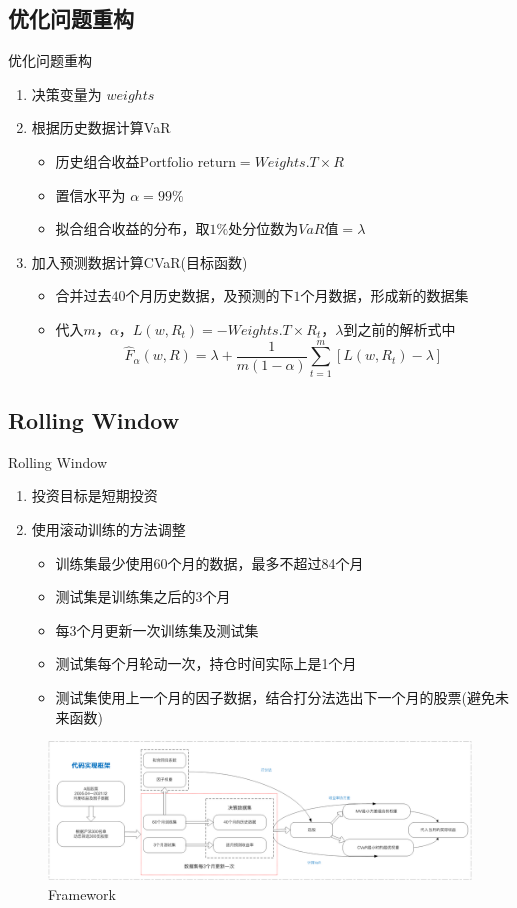 \documentclass[CJK,aspectratio=43]{beamer}  %
\begin{document}
\subsection{优化问题重构}
\begin{frame}{优化问题重构}
	\begin{enumerate}
		\item 决策变量为 $weights$
		\item 根据历史数据计算VaR
		\begin{itemize}
			\item 历史组合收益$ \text{Portfolio return} = Weights.T \times R $
			\item 置信水平为 $\alpha=99\%$
			\item 拟合组合收益的分布，取$1\%$处分位数为$VaR$值$=\lambda$
		\end{itemize}
		\item 加入预测数据计算CVaR(目标函数)
		\begin{itemize}
			\item 合并过去$40$个月历史数据，及预测的下$1$个月数据，形成新的数据集
			\item 代入$m$，$\alpha$，$L(w,R_t)=-Weights.T \times R_t$，$\lambda$到之前的解析式中
			$$
			\widehat{F}_{\alpha}(w,R)=\lambda+\frac{1}{m(1-\alpha)}\sum_{t=1}^{m}[L(w,R_t)-\lambda]
			$$
		\end{itemize}
	\end{enumerate}
\end{frame}

\subsection{Rolling Window}
\begin{frame}{Rolling Window}
	\begin{enumerate}
		\item 投资目标是短期投资
		\item 使用滚动训练的方法调整
		\begin{itemize}
			\item 训练集最少使用60个月的数据，最多不超过84个月
			\item 测试集是训练集之后的3个月
			\item 每3个月更新一次训练集及测试集
			\item 测试集每个月轮动一次，持仓时间实际上是1个月
			\item 测试集使用上一个月的因子数据，结合打分法选出下一个月的股票(避免未来函数)
		\end{itemize}
	\end{enumerate}
	\begin{figure}
		\centering
		\includegraphics[width=0.95\linewidth]{pic/framework}
		\caption{Framework}
		\label{fig:framework}
	\end{figure}
\end{frame}
\end{document}
